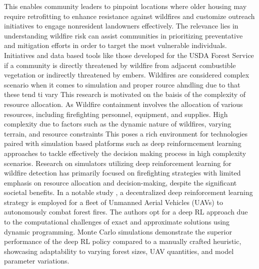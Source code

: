 \documentclass[lettersize,journal]{IEEEtran}
\begin{document}
This enables community leaders to pinpoint locations where older housing may require retrofitting to enhance resistance against wildfires and customize outreach initiatives to engage nonresident landowners effectively.
The relevance lies in understanding wildfire risk can assist communities in prioritizing preventative and mitigation efforts in order to target the most vulnerable individuals.
Initiatives and data based tools like those developed for the USDA Forest Service if a community is directly threatened by wildfire from adjacent combustible vegetation or indirectly threatened by embers.
Wildfires are considered complex scenario when it comes to simulation and proper rource ahndling due to that these tend ti vary 
This research is motivated on the baisis of the complexity of resource allocation. As Wildfire containment involves the allocation of various resources, including firefighting personnel, equipment, and supplies. High complexity due to factors such as the dynamic nature of wildfires, varying terrain, and resource constraints
This poses a rich environment for technologies paired with simulation based platforms such as deep reinformcement learning approaches to tackle effectively the decision making process in high complexity scenarios. 
Research on simulators utilizing deep reinforcement learning for wildfire detection has primarily focused on firefighting strategies with limited emphasis on resource allocation and decision-making, despite the significant societal benefits. In a notable study \cite{haksar_distributed_2018}, a decentralized deep reinforcement learning strategy is employed for a fleet of Unmanned Aerial Vehicles (UAVs) to autonomously combat forest fires. The authors opt for a deep RL approach due to the computational challenges of exact and approximate solutions using dynamic programming. Monte Carlo simulations demonstrate the superior performance of the deep RL policy compared to a manually crafted heuristic, showcasing adaptability to varying forest sizes, UAV quantities, and model parameter variations.
\end{document}
